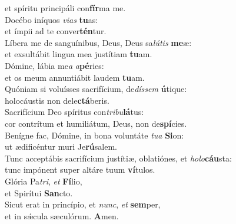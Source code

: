 \oddverse et spíritu principáli con\textbf{fír}ma me.\\
\evenverse Docébo iníquos \textit{vi}\textit{as} \textbf{tu}as:~\*\\
\evenverse et ímpii ad te conver\textbf{tén}tur.\\
\oddverse Líbera me de sanguínibus, Deus, Deus sa\textit{lú}\textit{tis} \textbf{me}æ:~\*\\
\oddverse et exsultábit lingua mea justítiam \textbf{tu}am.\\
\evenverse Dómine, lábia me\textit{a} \textit{a}\textbf{pé}ries:~\*\\
\evenverse et os meum annuntiábit laudem \textbf{tu}am.\\
\oddverse Quóniam si voluísses sacrifícium, de\textit{dís}\textit{sem} \textbf{ú}tique:~\*\\
\oddverse holocáustis non dele\textbf{ctá}beris.\\
\evenverse Sacrifícium Deo spíritus con\textit{tri}\textit{bu}\textbf{lá}tus:~\*\\
\evenverse cor contrítum et humiliátum, Deus, non de\textbf{spí}cies.\\
\oddverse Benígne fac, Dómine, in bona voluntáte \textit{tu}\textit{a} \textbf{Si}on:~\*\\
\oddverse ut ædificéntur muri Je\textbf{rú}salem.\\
\evenverse Tunc acceptábis sacrifícium justítiæ, oblatiónes, et \textit{ho}\textit{lo}\textbf{cáu}sta:~\*\\
\evenverse tunc impónent super altáre tuum \textbf{ví}tulos.\\
\oddverse Glória Pa\textit{tri}, \textit{et} \textbf{Fí}lio,~\*\\
\oddverse et Spirítui \textbf{San}cto.\\
\evenverse Sicut erat in princípio, et \textit{nunc}, \textit{et} \textbf{sem}per,~\*\\
\evenverse et in sǽcula sæculórum. \textbf{A}men.\\

